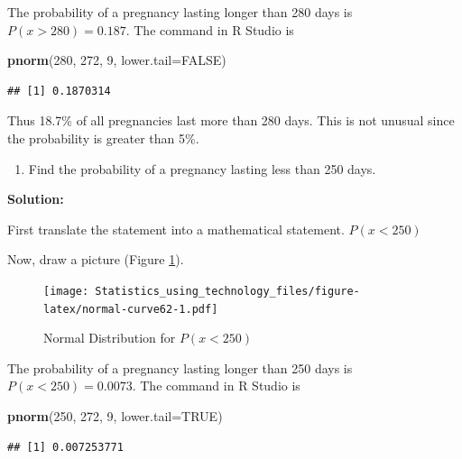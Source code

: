 \documentclass[
]{book}
\newenvironment{Shaded}{\begin{snugshade}}{\end{snugshade}}
\newcommand{\DataTypeTok}[1]{\textcolor[rgb]{0.13,0.29,0.53}{#1}}
\newcommand{\DecValTok}[1]{\textcolor[rgb]{0.00,0.00,0.81}{#1}}
\newcommand{\KeywordTok}[1]{\textcolor[rgb]{0.13,0.29,0.53}{\textbf{#1}}}
\newcommand{\NormalTok}[1]{#1}
\newcommand{\OtherTok}[1]{\textcolor[rgb]{0.56,0.35,0.01}{#1}}
\providecommand{\tightlist}{%
  \setlength{\itemsep}{0pt}\setlength{\parskip}{0pt}}
\begin{document}
The probability of a pregnancy lasting longer than 280 days is \(P(x>280)=0.187\). The command in R Studio is

\begin{Shaded}
\begin{Highlighting}[]
\KeywordTok{pnorm}\NormalTok{(}\DecValTok{280}\NormalTok{, }\DecValTok{272}\NormalTok{, }\DecValTok{9}\NormalTok{, }\DataTypeTok{lower.tail=}\OtherTok{FALSE}\NormalTok{)}
\end{Highlighting}
\end{Shaded}

\begin{verbatim}
## [1] 0.1870314
\end{verbatim}

Thus 18.7\% of all pregnancies last more than 280 days. This is not unusual since the probability is greater than 5\%.

\begin{enumerate}
\def\labelenumi{\alph{enumi}.}
\setcounter{enumi}{2}
\tightlist
\item
  Find the probability of a pregnancy lasting less than 250 days.
\end{enumerate}

\textbf{Solution:}

First translate the statement into a mathematical statement. \(P(x<250)\)

Now, draw a picture (Figure \ref{fig:normal-curve62}).



\begin{figure}
\centering
\texttt{[image: Statistics\_using\_technology\_files/figure-latex/normal-curve62-1.pdf]}
\caption{\label{fig:normal-curve62}Normal Distribution for \(P(x<250)\)}
\end{figure}

The probability of a pregnancy lasting longer than 250 days is \(P(x<250)=0.0073\). The command in R Studio is

\begin{Shaded}
\begin{Highlighting}[]
\KeywordTok{pnorm}\NormalTok{(}\DecValTok{250}\NormalTok{, }\DecValTok{272}\NormalTok{, }\DecValTok{9}\NormalTok{, }\DataTypeTok{lower.tail=}\OtherTok{TRUE}\NormalTok{)}
\end{Highlighting}
\end{Shaded}

\begin{verbatim}
## [1] 0.007253771
\end{verbatim}
\end{document}
